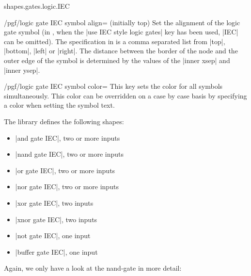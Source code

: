 \begin{pgflibrary}{shapes.gates.logic.IEC}
    \begin{key}{/pgf/logic gate IEC symbol align= (initially top)}
        Set the alignment of the logic gate symbol (in \tikzname, when the
        |use IEC style logic gates| key has been used, |IEC| can be omitted).
        The specification in  is a comma separated list from |top|,
        |bottom|, |left| or |right|. The distance between the border of the
        node and the outer edge of the symbol is determined by the values of
        the |inner xsep| and |inner ysep|.
\begin{codeexample}[preamble={\usetikzlibrary{shapes.gates.logic.IEC}}]
\end{codeexample}
    \end{key}

    \begin{key}{/pgf/logic gate IEC symbol color=}
        This key sets the color for all symbols simultaneously. This color can
        be overridden on a case by case basis by specifying a color when
        setting the symbol text.
    \end{key}

    The library defines the following shapes:
    \begin{itemize}
        \item |and gate IEC|, two or more inputs
        \item |nand gate IEC|, two or more inputs
        \item |or gate IEC|, two or more inputs
        \item |nor gate IEC|, two or more inputs
        \item |xor gate IEC|, two inputs
        \item |xnor gate IEC|, two inputs
        \item |not gate IEC|, one input
        \item |buffer gate IEC|, one input
    \end{itemize}

    Again, we only have a look at the nand-gate in more detail:


\end{pgflibrary}
